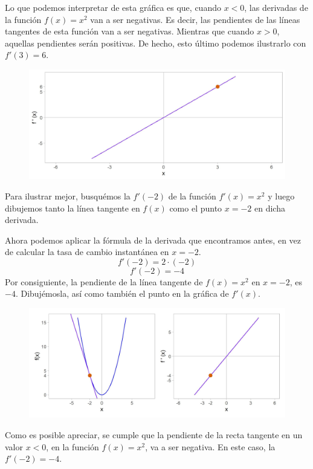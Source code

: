 \documentclass[12pt]{article}
\begin{document}
Lo que podemos interpretar de esta gráfica es que, cuando $x < 0$, las derivadas de la función $f(x) = x^{2}$ van a ser negativas. Es decir, las pendientes de las líneas tangentes de esta función van a ser negativas. Mientras que cuando $x > 0$, aquellas pendientes serán positivas. De hecho, esto último podemos ilustrarlo con $f'(3) = 6$.

\begin{figure}[hbt!]
\centering
\includegraphics[scale=0.7]{img/deriv_secpow_fun_2.jpg}
\end{figure}

Para ilustrar mejor, busquémos la $f'(-2)$ de la función $f'(x) = x^{2}$ y luego dibujemos tanto la línea tangente en $f(x)$ como el punto $x = -2$ en dicha derivada.

Ahora podemos aplicar la fórmula de la derivada que encontramos antes, en vez de calcular la tasa de cambio instantánea en $x = -2$.
\[f'(-2) = 2 \cdot (-2)\]
\[f'(-2) = -4\]
Por consiguiente, la pendiente de la línea tangente de $f(x) = x^{2}$ en $x = -2$, es $-4$. Dibujémosla, así como también el punto en la gráfica de $f'(x)$.

\begin{figure}[hbt!]
\centering
\includegraphics[scale=0.7]{img/deriv_tang_secpow.jpg}
\end{figure}

Como es posible apreciar, se cumple que la pendiente de la recta tangente en un valor $x < 0$, en la función $f(x) = x^{2}$, va a ser negativa. En este caso, la $f'(-2) = -4$.
\end{document}
